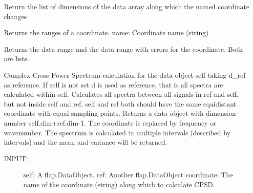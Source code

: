 \documentclass[letterpaper,10pt,english]{sphinxmanual}
\begin{document}
\begin{fulllineitems}
\begin{fulllineitems}
\end{fulllineitems}


\begin{fulllineitems}
\label{\detokenize{data_object:flap.data_object.DataObject.coordinate_nochange_dimensions}}
Return the list of dimensions of the data array along which
the named coordinate changes

\end{fulllineitems}


\begin{fulllineitems}
\label{\detokenize{data_object:flap.data_object.DataObject.coordinate_range}}
Returns the ranges of a coordinate.
name: Coordinate name (string)

Returns the data range and the data range with errors for the coordinate. Both are lists.

\end{fulllineitems}


\begin{fulllineitems}
\label{\detokenize{data_object:flap.data_object.DataObject.cpsd}}
Complex Cross Power Spectrum calculation for the data object self taking d\_ref as reference.
If self is not set d is used as reference, that is all spectra are calculated within self.
Calculates all spectra between all signals in ref and self, but not inside self and ref.
self and ref both should have the same equidistant coordinate with equal sampling points.
Returns a data object with dimension number self.dim+ref.dim-1. The coordinate is replaced
by frequency or wavenumber.
The spectrum is calculated in multiple intervals (described by intervals)
and the mean and variance will be returned.
\begin{description}
\item[{INPUT:}] \leavevmode
self: A flap.DataObject.
ref: Another flap.DataObject
coordinate: The name of the coordinate (string) along which to calculate CPSD.
\begin{quote}


\end{quote}
\end{description}
\end{fulllineitems}
\end{fulllineitems}
\end{document}
